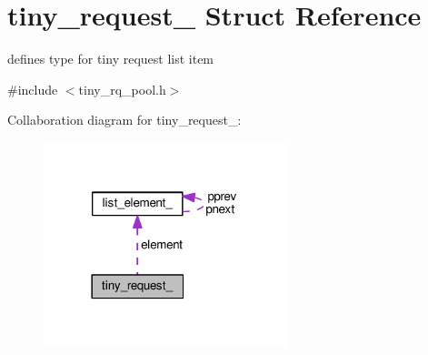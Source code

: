 \hypertarget{structtiny__request__}{}\section{tiny\+\_\+request\+\_\+ Struct Reference}
\label{structtiny__request__}


defines type for tiny request list item  




{\ttfamily \#include $<$tiny\+\_\+rq\+\_\+pool.\+h$>$}



Collaboration diagram for tiny\+\_\+request\+\_\+\+:
\nopagebreak
\begin{figure}[H]
\begin{center}
\leavevmode
\includegraphics[width=201pt]{structtiny__request____coll__graph}
\end{center}
\end{figure}

